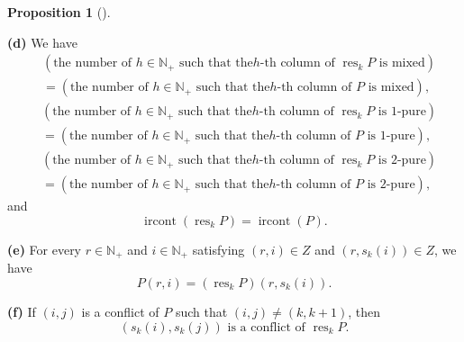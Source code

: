 \documentclass[numbers=enddot,12pt,final,onecolumn,notitlepage]{scrartcl}%
\theoremstyle{definition}
\newtheorem{prop}[theo]{Proposition}
\newenvironment{proposition}[1][]
{\begin{prop}[#1]\begin{leftbar}}
{\end{leftbar}\end{prop}}
\begin{document}
\begin{proposition}
\textbf{(d)} We have%
\begin{align}
&  \left(  \text{the number of }h\in\mathbb{N}_{+}\text{ such that the
}h\text{-th column of }\operatorname*{res}\nolimits_{k}P\text{ is
mixed}\right) \nonumber\\
&  =\left(  \text{the number of }h\in\mathbb{N}_{+}\text{ such that the
}h\text{-th column of }P\text{ is mixed}\right)  , \label{pf.lem.BK.res.mixed}%
\end{align}%
\begin{align}
&  \left(  \text{the number of }h\in\mathbb{N}_{+}\text{ such that the
}h\text{-th column of }\operatorname*{res}\nolimits_{k}P\text{ is
1-pure}\right) \nonumber\\
&  =\left(  \text{the number of }h\in\mathbb{N}_{+}\text{ such that the
}h\text{-th column of }P\text{ is 1-pure}\right)  ,
\label{pf.lem.BK.res.1pure}%
\end{align}%
\begin{align}
&  \left(  \text{the number of }h\in\mathbb{N}_{+}\text{ such that the
}h\text{-th column of }\operatorname*{res}\nolimits_{k}P\text{ is
2-pure}\right) \nonumber\\
&  =\left(  \text{the number of }h\in\mathbb{N}_{+}\text{ such that the
}h\text{-th column of }P\text{ is 2-pure}\right)  ,
\label{pf.lem.BK.res.2pure}%
\end{align}
and%
\begin{equation}
\operatorname*{ircont}\left(  \operatorname*{res}\nolimits_{k}P\right)
=\operatorname*{ircont}\left(  P\right)  . \label{pf.lem.BK.res.irconts}%
\end{equation}


\textbf{(e)} For every $r\in\mathbb{N}_{+}$ and $i\in\mathbb{N}_{+}$
satisfying $\left(  r,i\right)  \in Z$ and $\left(  r,s_{k}\left(  i\right)
\right)  \in Z$, we have%
\begin{equation}
P\left(  r,i\right)  =\left(  \operatorname*{res}\nolimits_{k}P\right)
\left(  r,s_{k}\left(  i\right)  \right)  . \label{pf.lem.BK.res.Pli}%
\end{equation}


\textbf{(f)} If $\left(  i,j\right)  $ is a conflict of $P$ such that $\left(
i,j\right)  \neq\left(  k,k+1\right)  $, then
\begin{equation}
\left(  s_{k}\left(  i\right)  ,s_{k}\left(  j\right)  \right)  \text{ is a
conflict of }\operatorname*{res}\nolimits_{k}P.
\label{pf.lem.BK.res.conflict1}%
\end{equation}



\end{proposition}
\end{document}
